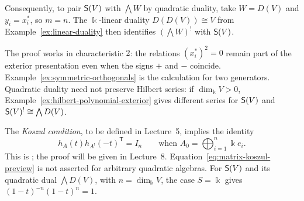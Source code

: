 Consequently, to pair $\mathsf{S}(V)$ with $\bigwedge W$ by quadratic duality, take $W=D(V)$ and $y_i=x_i^*$, so $m=n$.
The $\Bbbk$-linear duality $D(D(V))\cong V$ from Example~\ref{ex:linear-duality} then identifies $(\bigwedge W)^!$ with $\mathsf{S}(V)$.

The proof works in characteristic $2$: the relations $(x_i^*)^2=0$ remain part of the exterior presentation even when the signs $+$ and $-$ coincide.
Example~\ref{ex:symmetric-orthogonals} is the calculation for two generators.
Quadratic duality need not preserve Hilbert series: if $\dim_\Bbbk V>0$, Example~\ref{ex:hilbert-polynomial-exterior} gives different series for $\mathsf{S}(V)$ and $\mathsf{S}(V)^!\cong\bigwedge D(V)$.

\begin{advanced}
The \emph{Koszul condition}, to be defined in Lecture~5, implies the identity
\begin{equation}\label{eq:matrix-koszul-preview}
h_A(t)h_{A^!}(-t)^{\mathsf T}=I_n
\qquad\text{when }A_0=\bigoplus_{i=1}^n\Bbbk e_i.
\end{equation}
This is \cite[Lemma~2.11.1]{BGS96}; the proof will be given in Lecture~8.
Equation~\eqref{eq:matrix-koszul-preview} is not asserted for arbitrary quadratic algebras.
For $\mathsf{S}(V)$ and its quadratic dual $\bigwedge D(V)$, with $n=\dim_\Bbbk V$, the case $S=\Bbbk$ gives $(1-t)^{-n}(1-t)^n=1$.
\end{advanced}

